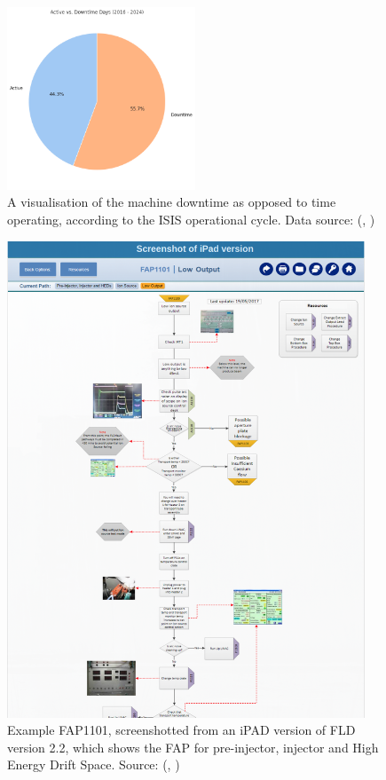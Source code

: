 \documentclass[10pt,oneside]{report}
\renewcommand{\citet}[1]{\citeauthor{#1}, \citeyear{#1}}
\begin{document}
\begin{figure}[htbp]
    \centering
    \includegraphics[width=0.5\textwidth]{isisDowntime.png}
    \caption{A visualisation of the machine downtime as opposed to time operating, according to the ISIS operational cycle. Data source: (\citet{isisbeamoperations2024})}\label{fig:isisDowntime}
\end{figure}
\begin{figure}[htbp]
    \centering
    \includegraphics[width=0.95\textwidth]{fap.png}
    \caption{Example FAP1101, screenshotted from an iPAD version of FLD version 2.2, which shows the FAP for pre-injector, injector and High Energy Drift Space. Source: (\citet{fld2017})}\label{fig:fap}
\end{figure}
\end{document}
